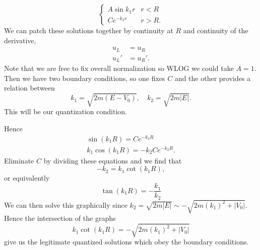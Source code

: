 \begin{exm}
\begin{equation}
\begin{cases}
            A \sin k_1 r & r < R\\
            C e^{-k_2 r} & r >R.
        \end{cases}
    \end{equation}
    We can patch these solutions together by continuity at $R$ and continuity of the derivative,
    \begin{align}
        u_L &= u_R\\
        u_L' &= u_R'.
    \end{align}
    Note that we are free to fix overall normalization so WLOG we could take $A=1$. Then we have two boundary conditions, so one fixes $C$ and the other provides a relation between
    \begin{equation}
        k_1 = \sqrt{2m(E-V_0)}, \quad k_2 = \sqrt{2m|E|}.
    \end{equation}
    This will be our quantization condition.
    
    Hence
    \begin{gather}
        \sin (k_1 R) = Ce^{-k_2 R}\\
        k_1 \cos(k_1 R) = -k_2 C e^{-k_2 R}. 
    \end{gather}
    Eliminate $C$ by dividing these equations and we find that
    \begin{equation}
        -k_2 = k_1 \cot(k_1 R),
    \end{equation}
    or equivalently
    \begin{equation}
        \tan(k_1 R) = -\frac{k_1}{k_2}
    \end{equation}
    We can then solve this graphically since $k_2 = \sqrt{2m|E|} \sim -\sqrt{2m(k_1)^2+|V_0|}$. Hence the intersection of the graphs
    \begin{equation}
        k_1 \cot(k_1 R) = -\sqrt{2m(k_1)^2+|V_0|}
    \end{equation}
    give us the legitimate quantized solutions which obey the boundary conditions.
\end{exm}